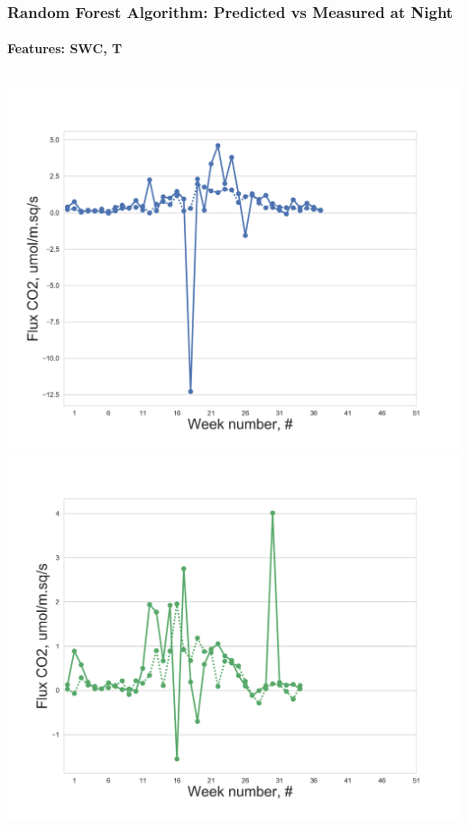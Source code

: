 \documentclass{beamer}
\begin{document}
\begin{frame}
\frametitle{Random Forest Algorithm: Predicted vs Measured at Night}
\framesubtitle{Features: SWC, T}
\begin{columns}[t]
\centering
\includegraphics[width=\textwidth]{F_ML_2/0.png}\\
\includegraphics[width=\textwidth]{F_ML_2/1.png}


\end{columns}
\end{frame}
\end{document}
